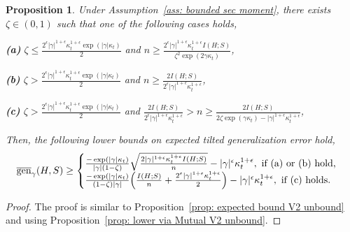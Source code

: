 \documentclass{article}
\theoremstyle{plain}
\theoremstyle{plain}
\newtheorem{proposition}[theorem]{Proposition}
\theoremstyle{definition}
\theoremstyle{remark}
\newcommand{\todoa}[2][]{\todo[size=tiny,color=blue!20!white,#1]{GA: #2}\xspace}
\begin{document}
\begin{proposition}\label{prop: expected lower V2 unbound}
Under Assumption~\ref{ass: bounded sec moment}, there exists $\zeta\in(0,1)$ such that one of the following cases holds,

\textbf{(a)} $\zeta \leq \frac{2^{\epsilon}|\gamma|^{1+\epsilon} \kappa_t^{1+\epsilon} \exp(|\gamma|\kappa_t)}{2}$ and  $n \geq \frac{2^{\epsilon}|\gamma|^{1+\epsilon} \kappa_t^{1+\epsilon} I(H;S)}{\zeta^2\exp(2\gamma \kappa_t)}$,

\textbf{(b)} $\zeta > \frac{2^{\epsilon}|\gamma|^{1+\epsilon} \kappa_t^{1+\epsilon} \exp(|\gamma|\kappa_t)}{2}$ and $n \geq \frac{2I(H;S)}{2^{\epsilon}|\gamma|^{1+\epsilon} \kappa_t^{1+\epsilon}}$,

\textbf{(c)} $\zeta > \frac{2^{\epsilon}|\gamma|^{1+\epsilon} \kappa_t^{1+\epsilon} \exp(|\gamma|\kappa_t)}{2}$ and $\frac{2I(H;S)}{2^{\epsilon}|\gamma|^{1+\epsilon} \kappa_t^{1+\epsilon}} > n \geq \frac{2I(H;S)}{2\zeta \exp(\gamma\kappa_t)-|\gamma|^{1+\epsilon} \kappa_t^{1+\epsilon}}$,
    
    Then, the following lower bounds on expected tilted generalization error hold,
\begin{equation*}
    \begin{split}
          \overline{\mathrm{gen}}_{\gamma}(H,S)\geq  \begin{cases}
           \frac{-\exp(|\gamma| \kappa_t)}{|\gamma|(1-\zeta)} \sqrt{\frac{2|\gamma|^{1+\epsilon} \kappa_t^{1+\epsilon} I(H;S)}{n}}- |\gamma|^\epsilon\kappa_t^{1+\epsilon}, \mbox{ \text{if (a) or (b) hold,}}\\
              \frac{-\exp(|\gamma| \kappa_t)}{(1-\zeta) |\gamma|}\Big( \frac{ I(H;S)}{n}+\frac{2^{\epsilon}|\gamma|^{1+\epsilon} \kappa_t^{1+\epsilon}}{2}\Big)- |\gamma|^\epsilon\kappa_t^{1+\epsilon}, \mbox{ \text{if (c) holds}}.
          \end{cases}
    \end{split}
\end{equation*}
\end{proposition}
\begin{proof}
 The proof is similar to Proposition~\ref{prop: expected bound V2 unbound} and using Proposition~\ref{prop: lower via Mutual V2 unbound}.
\end{proof}
\end{document}
